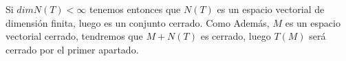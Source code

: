 \begin{ejercicio}
\begin{enumerate}
            Si $dim N(T)<\infty$ tenemos entonces que $N(T)$ es un espacio vectorial de dimensión finita, luego es un conjunto cerrado. Como Además, $M$ es un espacio vectorial cerrado, tendremos que $M+N(T)$ es cerrado, luego $T(M)$ será cerrado por el primer apartado.
    \end{enumerate}
\end{ejercicio}
